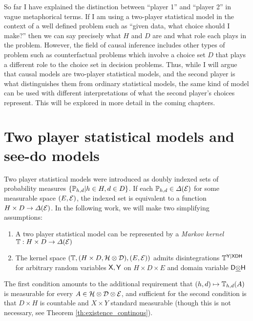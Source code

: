 So far I have explained the distinction between ``player 1'' and ``player 2'' in vague metaphorical terms. If I am using a two-player statistical model in the context of a well defined problem such as ``given data, what choice should I make?'' then we can say precisely what $H$ and $D$ are and what role each plays in the problem. However, the field of causal inference includes other types of problem such as counterfactual problems which involve a choice set $D$ that plays a different role to the choice set in decision problems. Thus, while I will argue that causal models are two-player statistical models, and the second player is what distinguishes them from ordinary statistical models, the same kind of model can be used with different interpretations of what the second player's choices represent. This will be explored in more detail in the coming chapters.


\section{Two player statistical models and see-do models}

Two player statistical models were introduced as doubly indexed sets of probability measures $\{\mathbb{P}_{h,d}|h\in H,d\in D\}$. If each $\mathbb{P}_{h,d}\in \Delta(\mathcal{E})$ for some measurable space $(E,\mathcal{E})$, the indexed set is equivalent to a function $H\times D\to \Delta(\mathcal{E})$. In the following work, we will make two simplifying assumptions:

\begin{enumerate}
    \item A two player statistical model can be represented by a \emph{Markov kernel} $\mathbb{T}:H\times D\to \Delta(\mathcal{E})$
    \item The kernel space $(\mathbb{T},(H\times D,\mathcal{H}\otimes\mathcal{D}),(E,\mathcal{E}))$ admits disintegrations $\mathbb{T}^{\mathsf{Y}|\mathsf{XDH}}$ for arbitrary random variables $\mathsf{X},\mathsf{Y}$ on $H\times D\times E$ and domain variable $\mathsf{D}\underline{\otimes}\mathsf{H}$
\end{enumerate}

The first condition amounts to the additional requirement that $(h,d)\mapsto \mathbb{T}_{h,d}(A)$ is measurable for every $A\in \mathcal{H}\otimes\mathcal{D}\otimes\mathcal{E}$, and sufficient for the second condition is that $D\times H$ is countable and $X\times Y$ standard measurable (though this is not necessary, see Theorem \ref{th:existence_continous}).

